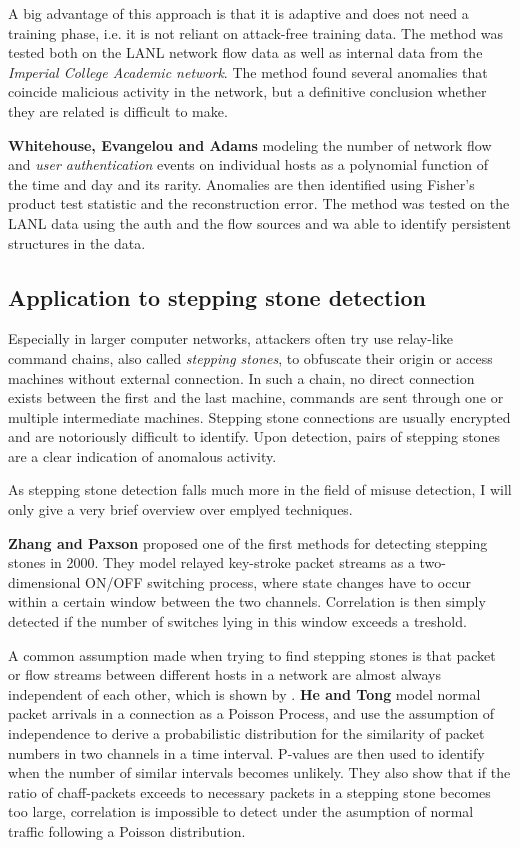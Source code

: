 A big advantage of this approach is that it is adaptive and does not need a training phase, i.e. it is not reliant on attack-free training data. The method was tested both on the LANL network flow data as well as internal data from the \textit{Imperial College Academic network}. The method found several anomalies that coincide malicious activity in the network, but a definitive conclusion whether they are related is difficult to make.

\textbf{Whitehouse, Evangelou and Adams} \cite{whitehouse_activity-based_2016} modeling the number of 
network flow and \textit{user authentication} events on individual hosts as a polynomial function of the time and day and its rarity. Anomalies are then identified using Fisher's product test statistic and the reconstruction error. The method was tested on the LANL data using the auth and the flow sources and wa able to identify persistent structures in the data. 


\subsection{Application to stepping stone detection}

Especially in larger computer networks, attackers often try use relay-like command chains, also called \textit{stepping stones}, to obfuscate their origin or access machines without external connection. In such a chain, no direct connection exists between the first and the last machine, commands are sent through one or multiple intermediate machines. Stepping stone connections are usually encrypted and are notoriously difficult to identify. Upon detection, pairs of stepping stones are a clear indication of anomalous activity. 

As stepping stone detection falls much more in the field of misuse detection, I will only give a very brief overview over emplyed techniques.

\textbf{Zhang and Paxson} \cite{zhang2000detecting} proposed one of the first methods for detecting stepping stones in 2000. They model relayed key-stroke packet streams as a two-dimensional ON/OFF switching process, where state changes have to occur within a certain window between the two channels. Correlation is then simply detected if the number of switches lying in this window exceeds a treshold. 


A common assumption made when trying to find stepping stones is that packet or flow streams between different hosts in a network are almost always independent of each other, which is shown by \cite{neil2013scan}. \textbf{He and Tong}\cite{he2007detecting} model normal packet arrivals in a connection as a Poisson Process, and use the assumption of independence to derive a probabilistic distribution for the similarity of packet numbers in two channels in a time interval. P-values are then used to identify when the number of similar intervals becomes unlikely. They also show that if the ratio of chaff-packets exceeds to necessary packets in a stepping stone becomes too large, correlation is impossible to detect under the asumption of normal traffic following a Poisson distribution.


